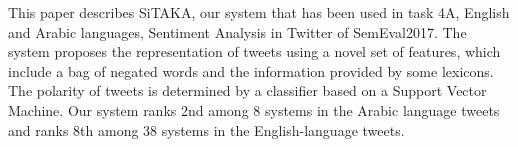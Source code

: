 This paper describes SiTAKA, our system that has been used in task 4A, English and Arabic languages, Sentiment Analysis in Twitter of SemEval2017. The system proposes the representation of tweets using a novel set of features, which include a bag of negated words and the information provided by some lexicons. The polarity of tweets is determined by a classifier based on a Support Vector Machine. Our system ranks 2nd among 8 systems in the Arabic language tweets and ranks 8th among 38 systems in the English-language tweets.
